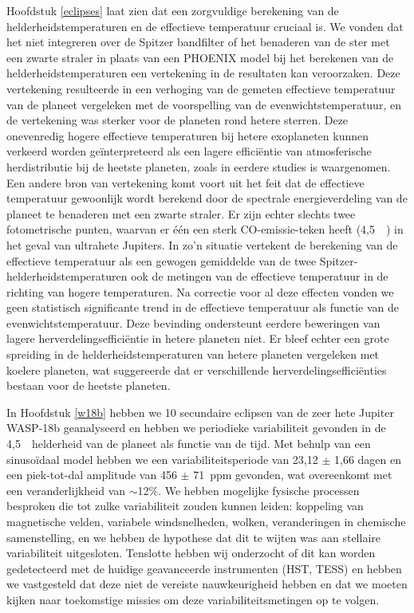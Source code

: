 Hoofdstuk \ref{eclipses} laat zien dat een zorgvuldige berekening van de helderheidstemperaturen en de effectieve temperatuur cruciaal is. We vonden dat het niet integreren over de Spitzer bandfilter of het benaderen van de ster met een zwarte straler in plaats van een PHOENIX model bij het berekenen van de helderheidstemperaturen een vertekening in de resultaten kan veroorzaken. Deze vertekening resulteerde in een verhoging van de gemeten effectieve temperatuur van de planeet vergeleken met de voorspelling van de evenwichtstemperatuur, en de vertekening was sterker voor de planeten rond hetere sterren. Deze onevenredig hogere effectieve temperaturen bij hetere exoplaneten kunnen verkeerd worden geïnterpreteerd als een lagere efficiëntie van atmosferische herdistributie bij de heetste planeten, zoals in eerdere studies is waargenomen. Een andere bron van vertekening komt voort uit het feit dat de effectieve temperatuur gewoonlijk wordt berekend door de spectrale energieverdeling van de planeet te benaderen met een zwarte straler. Er zijn echter slechts twee fotometrische punten, waarvan er één een sterk CO-emissie-teken heeft (4,5~\um~) in het geval van ultrahete Jupiters. In zo'n situatie vertekent de berekening van de effectieve temperatuur als een gewogen gemiddelde van de twee Spitzer-helderheidstemperaturen ook de metingen van de effectieve temperatuur in de richting van hogere temperaturen. Na correctie voor al deze effecten vonden we geen statistisch significante trend in de effectieve temperatuur als functie van de evenwichtstemperatuur. Deze bevinding ondersteunt eerdere beweringen van lagere herverdelingsefficiëntie in hetere planeten niet. Er bleef echter een grote spreiding in de helderheidstemperaturen van hetere planeten vergeleken met koelere planeten, wat suggereerde dat er verschillende herverdelingsefficiënties bestaan voor de heetste planeten.

In Hoofdstuk \ref{w18b} hebben we 10 secundaire eclipsen van de zeer hete Jupiter WASP-18b geanalyseerd en hebben we periodieke variabiliteit gevonden in de 4,5~\um~helderheid van de planeet als functie van de tijd. Met behulp van een sinusoïdaal model hebben we een variabiliteitsperiode van 23,12 $\pm$ 1,66 dagen en een piek-tot-dal amplitude van 456 $\pm$ 71~ppm gevonden, wat overeenkomt met een veranderlijkheid van $\sim$12\%. We hebben mogelijke fysische processen besproken die tot zulke variabiliteit zouden kunnen leiden: koppeling van magnetische velden, variabele windsnelheden, wolken, veranderingen in chemische samenstelling, en we hebben de hypothese dat dit te wijten was aan stellaire variabiliteit uitgesloten. Tenslotte hebben wij onderzocht of dit kan worden gedetecteerd met de huidige geavanceerde instrumenten (HST, TESS) en hebben we vastgesteld dat deze niet de vereiste nauwkeurigheid hebben en dat we moeten kijken naar toekomstige missies om deze variabiliteitsmetingen op te volgen.


